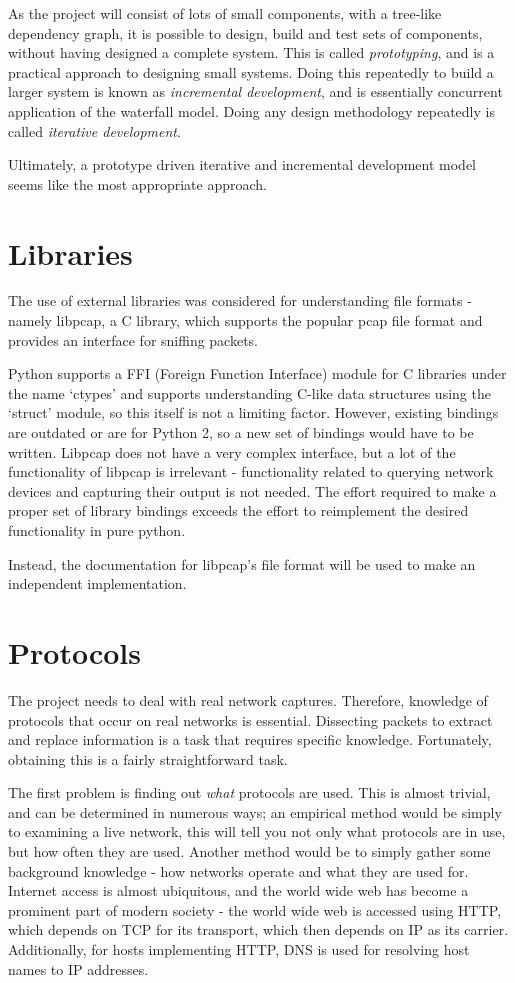 \documentclass[10pt,a4paper,notitlepage]{report}
\begin{document}
As the project will consist of lots of small components, with a tree-like dependency graph, it is possible to design, build and test sets of components, without having designed a complete system. This is called \emph{prototyping}, and is a practical approach to designing small systems.
Doing this repeatedly to build a larger system is known as \emph{incremental development}, and is essentially concurrent application of the waterfall model. Doing any design methodology repeatedly is called \emph{iterative development}.

Ultimately, a prototype driven iterative and incremental development model seems like the most appropriate approach.

\section{Libraries}
The use of external libraries was considered for understanding file formats - namely libpcap, a C library, which supports the popular pcap file format and provides an interface for sniffing packets.

Python supports a FFI (Foreign Function Interface) module for C libraries under the name `ctypes' and supports understanding C-like data structures using the `struct' module, so this itself is not a limiting factor.
However, existing bindings are outdated or are for Python 2, so a new set of bindings would have to be written. Libpcap does not have a very complex interface, but a lot of the functionality of libpcap is irrelevant - functionality related to querying network devices and capturing their output is not needed. The effort required to make a proper set of library bindings exceeds the effort to reimplement the desired functionality in pure python.

Instead, the documentation for libpcap's file format will be used to make an independent implementation.

\section{Protocols}
\label{sec:protocols}
The project needs to deal with real network captures. Therefore, knowledge of protocols that occur on real networks is essential. Dissecting packets to extract and replace information is a task that requires specific knowledge. Fortunately, obtaining this is a fairly straightforward task.

The first problem is finding out \emph{what} protocols are used. This is almost trivial, and can be determined in numerous ways; an empirical method would be simply to examining a live network, this will tell you not only what protocols are in use, but how often they are used.
Another method would be to simply gather some background knowledge - how networks operate and what they are used for. Internet access is almost ubiquitous, and the world wide web has become a prominent part of modern society - the world wide web is accessed using HTTP, which depends on TCP for its transport, which then depends on IP as its carrier. Additionally, for hosts implementing HTTP, DNS is used for resolving host names to IP addresses.
\end{document}
